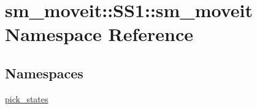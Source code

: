 \hypertarget{namespacesm__moveit_1_1SS1_1_1sm__moveit}{}\section{sm\+\_\+moveit\+:\+:S\+S1\+:\+:sm\+\_\+moveit Namespace Reference}
\label{namespacesm__moveit_1_1SS1_1_1sm__moveit}
\subsection*{Namespaces}
\begin{DoxyCompactItemize}
\item 
 \hyperlink{namespacesm__moveit_1_1SS1_1_1sm__moveit_1_1pick__states}{pick\+\_\+states}
\end{DoxyCompactItemize}
